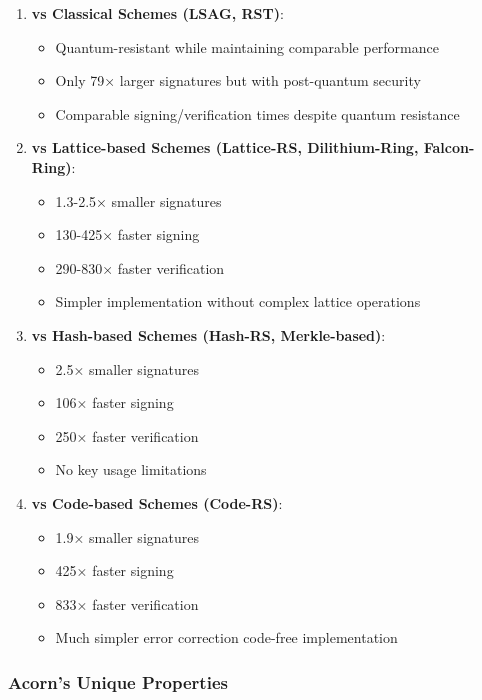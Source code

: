\documentclass[11pt,a4paper]{article}
\begin{document}
\begin{enumerate}
\item \textbf{vs Classical Schemes (LSAG, RST)}:
   \begin{itemize}
   \item Quantum-resistant while maintaining comparable performance
   \item Only 79× larger signatures but with post-quantum security
   \item Comparable signing/verification times despite quantum resistance
   \end{itemize}

\item \textbf{vs Lattice-based Schemes (Lattice-RS, Dilithium-Ring, Falcon-Ring)}:
   \begin{itemize}
   \item 1.3-2.5× smaller signatures
   \item 130-425× faster signing
   \item 290-830× faster verification
   \item Simpler implementation without complex lattice operations
   \end{itemize}

\item \textbf{vs Hash-based Schemes (Hash-RS, Merkle-based)}:
   \begin{itemize}
   \item 2.5× smaller signatures
   \item 106× faster signing
   \item 250× faster verification
   \item No key usage limitations
   \end{itemize}

\item \textbf{vs Code-based Schemes (Code-RS)}:
   \begin{itemize}
   \item 1.9× smaller signatures
   \item 425× faster signing
   \item 833× faster verification
   \item Much simpler error correction code-free implementation
   \end{itemize}
\end{enumerate}

\subsubsection{Acorn's Unique Properties}
\end{document}
